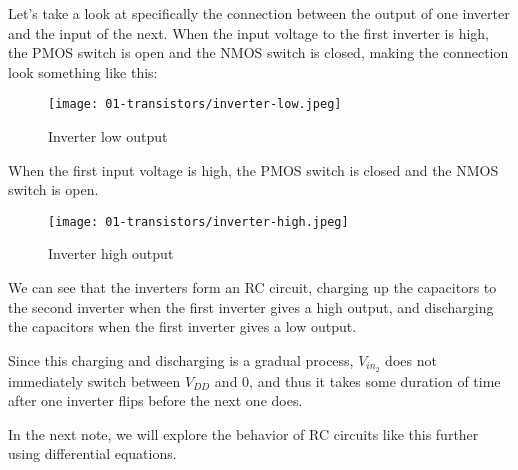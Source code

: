 \documentclass[11pt]{article}
\begin{document}
Let's take a look at specifically the connection between the output of one inverter and the input of the next. When the input voltage to the first inverter is high, the PMOS switch is open and the NMOS switch is closed, making the connection look something like this:

\begin{figure}[H]
    \centering
        \texttt{[image: 01-transistors/inverter-low.jpeg]}
    \caption{Inverter low output}
\end{figure}

When the first input voltage is high, the PMOS switch is closed and the NMOS switch is open.

\begin{figure}[H]
    \centering
        \texttt{[image: 01-transistors/inverter-high.jpeg]}
    \caption{Inverter high output}
\end{figure}

We can see that the inverters form an RC circuit, charging up the capacitors to the second inverter when the first inverter gives a high output, and discharging the capacitors when the first inverter gives a low output. 

Since this charging and discharging is a gradual process, $V_{in_2}$ does not immediately switch between $V_{DD}$ and $0$, and thus it takes some duration of time after one inverter flips before the next one does.

In the next note, we will explore the behavior of RC circuits like this further using differential equations. 
\end{document}
